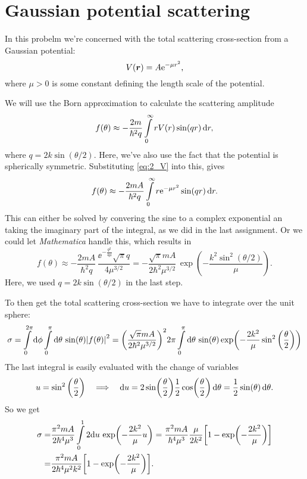 \documentclass[11pt,letter, swedish, english
]{article}
\begin{document}
\section{Gaussian potential scattering}
In this probelm we're concerned with the total scattering
cross-section from a Gaussian potential:
\begin{equation}\label{eq:2_V}
V(\vb*{r})=A\mathrm{e}^{-\mu r^2},
\end{equation}
where $\mu>0$ is some constant defining the length scale of the potential.

We will use the Born approximation to calculate the scattering
amplitude
\begin{equation}
f(\theta)\approx -\frac{2m}{\hbar^2q}
\int_0^\infty r V(r) \sin(qr)\id{r},
\end{equation}
where $q=2k\sin(\theta/2)$. Here, we've also use the fact that the
potential is spherically symmetric.
Substituting \eqref{eq:2_V} into this, gives
\begin{equation}
f(\theta)\approx -\frac{2mA}{\hbar^2q}
\int_0^\infty r \ee^{-\mu r^2} \sin(qr)\id{r}.
\end{equation}
This can either be solved by convering the sine to a complex
exponential an taking the imaginary part of the integral, as we did in
the last assignment. Or we could let \textit{Mathematica} handle this,
which results in
\begin{equation}
f(\theta)\approx -\frac{2mA}{\hbar^2q}\,
\frac{\ee^{-\frac{q^2}{4\mu}}\sqrt{\pi}q}{4\mu^{3/2}}
=-\frac{\sqrt{\pi}mA}{2\hbar^2\mu^{3/2}}\,\exp(-\frac{k^2\sin^2(\theta/2)}{\mu}).
\end{equation}
Here, we used $q=2k\sin(\theta/2)$ in the last step.

To then get the total scattering cross-section we have to integrate
over the unit sphere:
\begin{equation}
\sigma=\int_0^{2\pi}\rd{\phi}
\int_0^\pi\rd\theta\,\sin(\theta) \abs{f(\theta)}^2
=\qty(\frac{\sqrt{\pi}mA}{2\hbar^2\mu^{3/2}})^2 2\pi 
\int_0^\pi\rd\theta\,\sin(\theta)
\exp(-\frac{2k^2}{\mu}\sin^2\qty(\frac{\theta}{2}))
\end{equation}
The last integral is easily evaluated with the change of variables
\begin{equation}
u=\sin^2\qty(\frac{\theta}{2})
\quad\Longrightarrow\quad
\mathrm{d}{u}=
2\sin(\frac{\theta}{2})\frac{1}{2}\cos(\frac{\theta}{2})\,\mathrm{d}\theta
=\frac{1}{2}\sin(\theta)\,\mathrm{d}\theta.
\end{equation}
So we get
\begin{equation}
\begin{aligned}
\sigma=&
\frac{\pi^2mA}{2\hbar^4\mu^{3}}  
\int_0^1 2\rd{u}\,\exp(-\frac{2k^2}{\mu}u)
=\frac{\pi^2mA}{\hbar^4\mu^{3}} \frac{\mu}{2k^2}
\qty[1-\exp(-\frac{2k^2}{\mu})]\\
=&\frac{\pi^2mA}{2\hbar^4\mu^{2}k^2}
\qty[1-\exp(-\frac{2k^2}{\mu})].
\end{aligned}
\end{equation}
\end{document}
